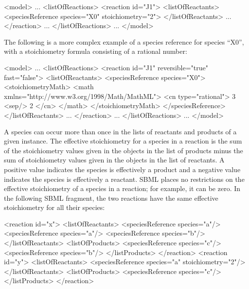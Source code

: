 \begin{example}
<model>
    ...
    <listOfReactions>
        <reaction id="J1">
            <listOfReactants>
                <speciesReference species="X0" stoichiometry="2">
            </listOfReactants>
            ...
        </reaction>
        ...
    </listOfReactions>
    ...
</model>
\end{example}

The following is a more complex example of a species reference for
species ``X0'', with a stoichiometry formula consisting of
a rational number:

\begin{example}
<model>
    ...
    <listOfReactions>
        <reaction id="J1" reversible="true" fast="false">
            <listOfReactants>
                <speciesReference species="X0">
                    <stoichiometryMath>
                        <math xmlns="http://www.w3.org/1998/Math/MathML"> 
                            <cn type="rational"> 3 <sep/> 2 </cn>
                        </math>
                    </stoichiometryMath>
                </speciesReference>
            </listOfReactants>
            ...
        </reaction>
        ...
    </listOfReactions>
    ...
</model>
\end{example}

A species can occur more than once in the lists of reactants and
products of a given \Reaction instance.  The effective
stoichiometry for a species in a reaction is the sum of the
stoichiometry values given in the \SpeciesReference objects in
the list of products minus the sum of stoichiometry values given
in the \SpeciesReference objects in the list of reactants.  A
positive value indicates the species is effectively a product and
a negative value indicates the species is effectively a reactant.
SBML places no restrictions on the effective stoichiometry of a
species in a reaction; for example, it can be zero.  In the
following SBML fragment, the two reactions have the same effective
stoichiometry for all their species:

\begin{example}
<reaction id="x">
    <listOfReactants>
        <speciesReference species="a"/>
        <speciesReference species="a"/>
        <speciesReference species="b"/>
    </listOfReactants>
    <listOfProducts>
        <speciesReference species="c"/>
        <speciesReference species="b"/>
    </listProducts>
</reaction>
<reaction id="y">
    <listOfReactants>
        <speciesReference species="a" stoichiometry="2"/>
    </listOfReactants>
    <listOfProducts>
        <speciesReference species="c"/>
    </listProducts>
</reaction>
\end{example}

